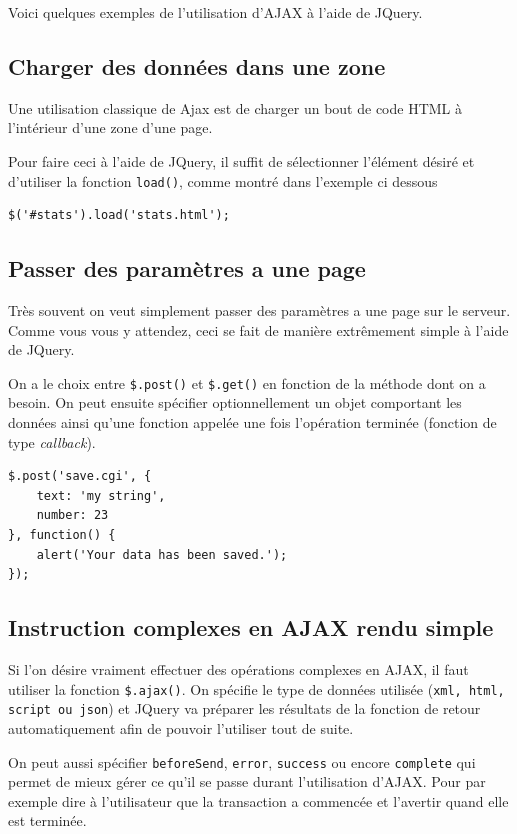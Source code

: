 \documentclass[10pt,a4paper,titlepage]{article}
\begin{document}
Voici quelques exemples de l'utilisation d'AJAX à l'aide de JQuery.

\subsection{Charger des données dans une zone}

Une utilisation classique de Ajax est de charger un bout de code HTML à l'intérieur d'une zone d'une page.

Pour faire ceci à l'aide de JQuery, il suffit de sélectionner l'élément désiré et d'utiliser la fonction \texttt{load()}, comme montré dans l'exemple ci dessous 

\begin{lstlisting}
$('#stats').load('stats.html');
\end{lstlisting}


\subsection{Passer des paramètres a une page}

Très souvent on veut simplement passer des paramètres a une page sur le serveur. Comme vous vous y attendez, ceci se fait de manière extrêmement simple à l'aide de JQuery. 

On a le choix entre \texttt{\$.post()} et \texttt{\$.get()} en fonction de la méthode dont on a besoin. On peut ensuite spécifier optionnellement un objet comportant les données ainsi qu'une fonction appelée une fois l'opération terminée (fonction de type \emph{callback}).

\begin{lstlisting}
$.post('save.cgi', {
    text: 'my string',
    number: 23
}, function() {
    alert('Your data has been saved.');
});
\end{lstlisting}
                                   
\subsection{Instruction complexes en AJAX rendu simple}

Si l'on désire vraiment effectuer des opérations complexes en AJAX, il faut utiliser la fonction \texttt{\$.ajax()}. On spécifie le type de données utilisée (\texttt{xml, html, script ou json}) et JQuery va préparer les résultats de la fonction de retour automatiquement afin de pouvoir l'utiliser tout de suite. 

On peut aussi spécifier \texttt{beforeSend}, \texttt{error}, \texttt{success} ou encore \texttt{complete} qui permet de mieux gérer ce qu'il se passe durant l'utilisation d'AJAX. Pour par exemple dire à l'utilisateur que la transaction a commencée et l'avertir quand elle est terminée.
\end{document}
